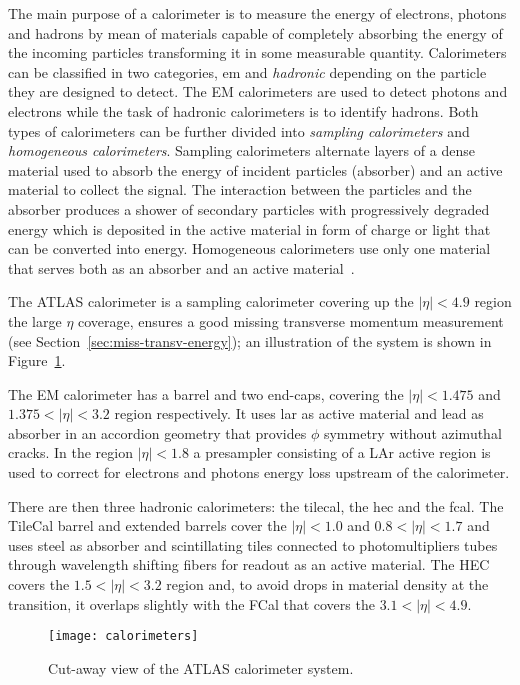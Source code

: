The main purpose of a calorimeter is to measure the energy of electrons, photons
and hadrons by mean of materials capable of completely absorbing the energy of
the incoming particles transforming it in some measurable quantity. Calorimeters
can be classified in two categories, \gls{em} and \emph{hadronic} depending on
the particle they are designed to detect. The EM calorimeters are used to detect
photons and electrons while the task of hadronic calorimeters is to identify
hadrons. Both types of calorimeters can be further divided into \emph{sampling
  calorimeters} and \emph{homogeneous calorimeters}. Sampling calorimeters
alternate layers of a dense material used to absorb the energy of incident
particles (absorber) and an active material to collect the signal. The
interaction between the particles and the absorber produces a shower of
secondary particles with progressively degraded energy which is deposited in the
active material in form of charge or light that can be converted into
energy. Homogeneous calorimeters use only one material that serves both as an
absorber and an active material~\cite{Calorimetry}.

The ATLAS calorimeter is a sampling calorimeter covering up the $|\eta| < 4.9$
region the large $\eta$ coverage, ensures a good missing transverse momentum
measurement (see Section~\ref{sec:miss-transv-energy}); an illustration of the
system is shown in Figure~\ref{fig:calo}.

The EM calorimeter has a barrel and two end-caps, covering the $|\eta| < 1.475$
and $1.375 < |\eta| < 3.2$ region respectively. It uses \gls{lar} as active
material and lead as absorber in an accordion geometry that provides $\phi$
symmetry without azimuthal cracks. In the region $|\eta| < 1.8$ a presampler
consisting of a LAr active region is used to correct for electrons and photons
energy loss upstream of the calorimeter.

There are then three hadronic calorimeters: the \gls{tilecal}, the \gls{hec} and
the \gls{fcal}. The TileCal barrel and extended barrels cover the $|\eta| < 1.0$
and $0.8 < |\eta| < 1.7$ and uses steel as absorber and scintillating tiles
connected to photomultipliers tubes through wavelength shifting fibers for
readout as an active material. The HEC covers the $1.5 < |\eta| < 3.2$ region
and, to avoid drops in material density at the transition, it overlaps slightly
with the FCal that covers the $3.1 < |\eta| < 4.9$.

\begin{figure}[!h]
  \centering
    \texttt{[image: calorimeters]}
    \caption{Cut-away view of the ATLAS calorimeter system.}
    \label{fig:calo}
\end{figure}
